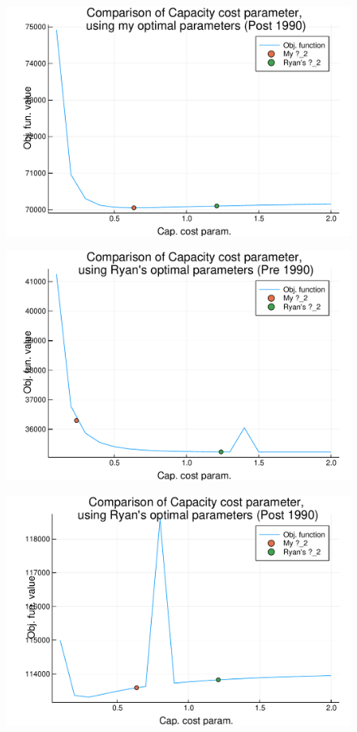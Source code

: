 \documentclass[12pt]{article}
\begin{document}
\begin{figure}
\begin{center}
\includegraphics[scale=0.6]{../results/paramcomp-p90-S.pdf} 
\end{center}
\label{fig:d2comp-p90}
\end{figure}

\begin{figure}
\begin{center}
\includegraphics[scale=0.6]{../results/paramcomp-R.pdf} 
\end{center}
\label{fig:d2comp-r}
\end{figure}

\begin{figure}
\begin{center}
\includegraphics[scale=0.6]{../results/paramcomp-p90-R.pdf} 
\end{center}
\label{fig:d2comp-p90-r}
\end{figure}
\end{document}
